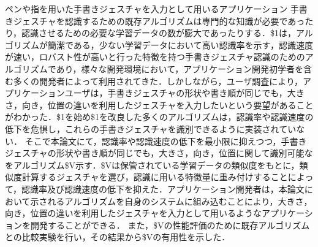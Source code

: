 ペンや指を用いた手書きジェスチャを入力として用いるアプリケーション
手書きジェスチャを認識するための既存アルゴリズムは専門的な知識が必要であったり，認識させるための必要な学習データの数が膨大であったりする．\$1は，アルゴリズムが簡潔である，少ない学習データにおいて高い認識率を示す，認識速度が速い，ロバスト性が高いと行った特徴を持つ手書きジェスチャ認識のためのアルゴリズムであり，様々な開発環境において，アプリケーション開発初学者を含む多くの開発者によって利用されてきた．しかしながら，ユーザ調査により，アプリケーションユーザは，手書きジェスチャの形状や書き順が同じでも，大きさ，向き，位置の違いを利用したジェスチャを入力したいという要望があることがわかった．\$1を始め\$1を改良した多くのアルゴリズムは，認識率や認識速度の低下を危惧し，これらの手書きジェスチャを識別できるように実装されていない．
そこで本論文にて，認識率や認識速度の低下を最小限に抑えつつ，手書きジェスチャの形状や書き順が同じでも，大きさ，向き，位置に関して識別可能なをアルゴリズム\$V示す．\$Vは保管されている学習データの類似度をもとに，類似度計算するジェスチャを選び，認識に用いる特徴量に重み付けすることによって，認識率及び認識速度の低下を抑えた．アプリケーション開発者は，本論文において示されるアルゴリズムを自身のシステムに組み込むことにより，大きさ，向き，位置の違いを利用したジェスチャを入力として用いるようなアプリケーションを開発することができる．
また，\$Vの性能評価のために既存アルゴリズムとの比較実験を行い，その結果から\$Vの有用性を示した．
